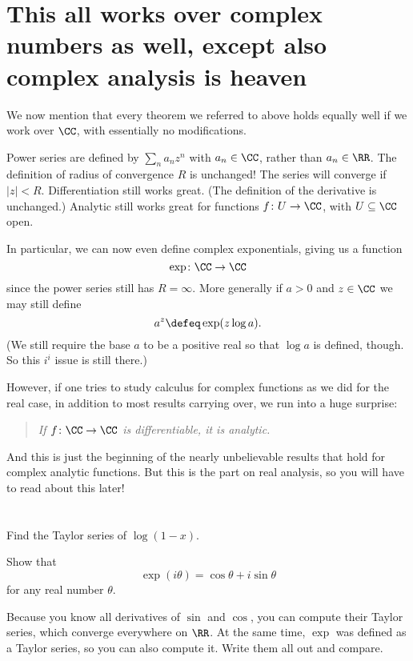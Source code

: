 \section{This all works over complex numbers as well,
except also complex analysis is heaven}
We now mention that every theorem we referred to above
holds equally well if we work over $\CC$,
with essentially no modifications.
\begin{itemize}
	\ii Power series are defined by $\sum_n a_n z^n$ with $a_n \in \CC$,
	rather than $a_n \in \RR$.
	\ii The definition of radius of convergence $R$ is unchanged!
	The series will converge if $|z| < R$.
	\ii Differentiation still works great.
	(The definition of the derivative is unchanged.)
	\ii Analytic still works great for functions
	$f \colon U \to \CC$, with $U \subseteq \CC$ open.
\end{itemize}
In particular, we can now even define complex exponentials,
giving us a function \[ \exp \colon \CC \to \CC \]
since the power series still has $R = \infty$.
More generally if $a > 0$ and $z \in \CC$
we may still define \[ a^z \defeq \exp(z \log a). \]
(We still require the base $a$ to be a positive real
so that $\log a$ is defined, though.
So this $i^i$ issue is still there.)

However, if one tries to study calculus for complex functions
as we did for the real case,
in addition to most results carrying over,
we run into a huge surprise:
\begin{quote}
	\itshape
	If $f \colon \CC \to \CC$ is differentiable,
	it is analytic.
\end{quote}
And this is just the beginning of the nearly unbelievable
results that hold for complex analytic functions.
But this is the part on real analysis,
so you will have to read about this later!

\section{\problemhead}

\begin{problem}
	Find the Taylor series of $\log(1-x)$.
\end{problem}

\begin{dproblem}
	Show that \[ \exp(i \theta) = \cos \theta + i \sin \theta \]
	for any real number $\theta$.
	\begin{hint}
		Because you know all derivatives of $\sin$ and $\cos$,
		you can compute their Taylor series,
		which converge everywhere on $\RR$.
		At the same time, $\exp$ was defined as a Taylor series,
		so you can also compute it.
		Write them all out and compare.
	\end{hint}
\end{dproblem}

